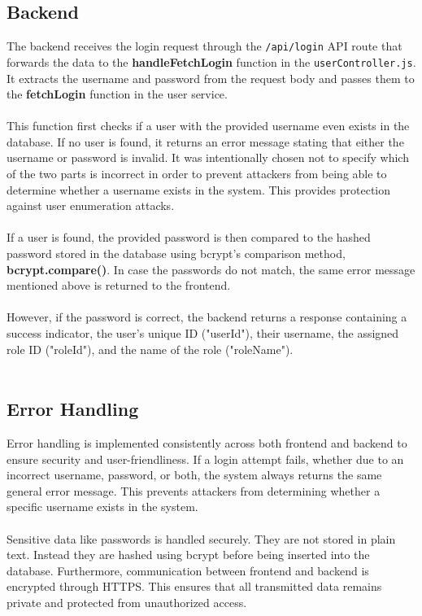 \documentclass[a4paper,12pt]{report}
\begin{document}
\subsection{Backend}
The backend receives the login request through the \texttt{/api/login} API route that forwards the data to the \textbf{handleFetchLogin} function in the \texttt{userController.js}. It extracts the username and password from the request body and passes them to the \textbf{fetchLogin} function in the user service. \\\\
This function first checks if a user with the provided username even exists in the database. If no user is found, it returns an error message stating that either the username or password is invalid. It was intentionally chosen not to specify which of the two parts is incorrect in order to prevent attackers from being able to determine whether a username exists in the system. This provides protection against user enumeration attacks. \\\\
If a user is found, the provided password is then compared to the hashed password stored in the database using bcrypt's comparison method, \textbf{bcrypt.compare()}. In case the passwords do not match, the same error message mentioned above is returned to the frontend. \\\\
However, if the password is correct, the backend returns a response containing a success indicator, the user's unique ID ("userId"), their username, the assigned role ID ("roleId"), and the name of the role ("roleName"). \\\\
\subsection{Error Handling}
Error handling is implemented consistently across both frontend and backend to ensure security and user-friendliness. If a login attempt fails, whether due to an incorrect username, password, or both, the system always returns the same general error message. This prevents attackers from determining whether a specific username exists in the system.\\\\
Sensitive data like passwords is handled securely. They are not stored in plain text. Instead they are hashed using bcrypt before being inserted into the database. Furthermore, communication between frontend and backend is encrypted through HTTPS. This ensures that all transmitted data remains private and protected from unauthorized access.
\end{document}
